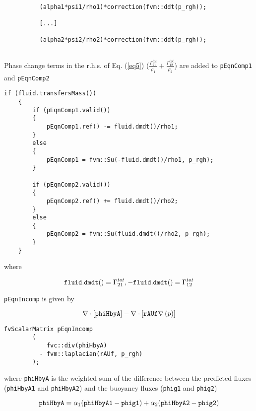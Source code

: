 \documentclass[a4paper, 12 pt, fleqn]{article}
\begin{document}
{\begin{lstlisting}[frame=single] 

          (alpha1*psi1/rho1)*correction(fvm::ddt(p_rgh));

          [...]
          
          (alpha2*psi2/rho2)*correction(fvm::ddt(p_rgh));
          
\end{lstlisting}\label{lst4}

Phase change terms in the r.h.s. of Eq. (\ref{eq5}) ($\frac{\Gamma_{21}^{tot}}{\rho_1} + \frac{\Gamma_{12}^{tot}}{\rho_2}$) are  added to {\tt pEqnComp1} and {\tt pEqnComp2}

\begin{lstlisting}[frame=single] 
    if (fluid.transfersMass())
    {
        if (pEqnComp1.valid())
        {
            pEqnComp1.ref() -= fluid.dmdt()/rho1;
        }
        else
        {
            pEqnComp1 = fvm::Su(-fluid.dmdt()/rho1, p_rgh);
        }

        if (pEqnComp2.valid())
        {
            pEqnComp2.ref() += fluid.dmdt()/rho2;
        }
        else
        {
            pEqnComp2 = fvm::Su(fluid.dmdt()/rho2, p_rgh);
        }
    }
\end{lstlisting}\label{lst6}

where

\begin{equation}\label{eq6c}
{\tt fluid.dmdt()} = \Gamma_{21}^{tot}, \\
{\tt -fluid.dmdt()} = \Gamma_{12}^{tot}
\end{equation}

 {\tt pEqnIncomp} is given by
 
 \begin{equation}\label{eq7c}
 \nabla \cdot \left[ {\tt phiHbyA} \right] - \nabla \cdot \left[ {\tt rAUf} \nabla \left(p\right) \right]
 \end{equation}
 
 \begin{lstlisting}[frame=single] 
         fvScalarMatrix pEqnIncomp
        (
            fvc::div(phiHbyA)
          - fvm::laplacian(rAUf, p_rgh)
        );
 \end{lstlisting} \label{lst7}

where {\tt phiHbyA} is the weighted sum of the difference between the predicted fluxes ({\tt phiHbyA1} and {\tt phiHbyA2}) and the buoyancy fluxes ({\tt phig1} and {\tt phig2}) 

\begin{equation}\label{eq8c}
{\tt phiHbyA} = \alpha_1({\tt phiHbyA1} - {\tt phig1}) + \alpha_2({\tt phiHbyA2} - {\tt phig2})
\end{equation}

}
\end{document}
